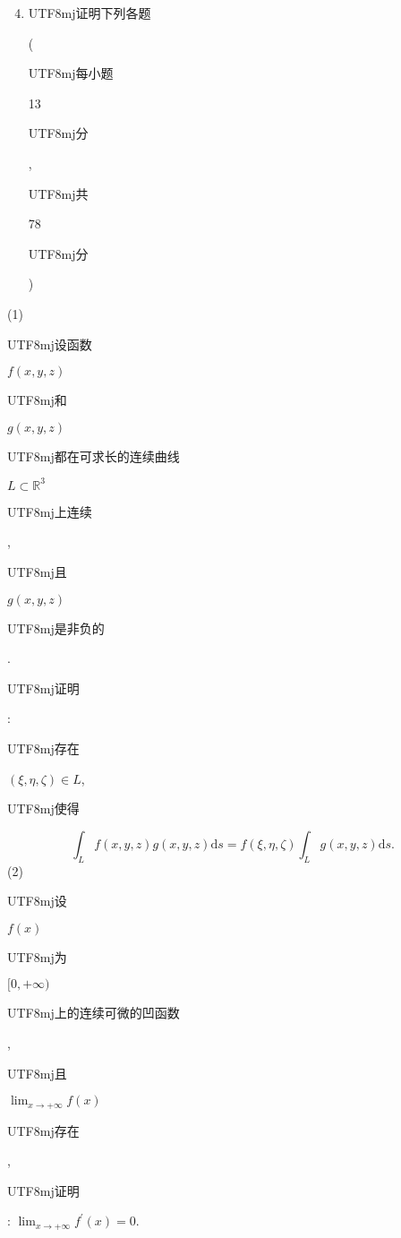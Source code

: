 \documentclass[10pt]{article}
\begin{document}
\begin{enumerate}
  \setcounter{enumi}{3}
  \item \begin{CJK}{UTF8}{mj}证明下列各题\end{CJK} (\begin{CJK}{UTF8}{mj}每小题\end{CJK} 13 \begin{CJK}{UTF8}{mj}分\end{CJK}, \begin{CJK}{UTF8}{mj}共\end{CJK} 78 \begin{CJK}{UTF8}{mj}分\end{CJK})
\end{enumerate}
(1) \begin{CJK}{UTF8}{mj}设函数\end{CJK} $f(x, y, z)$ \begin{CJK}{UTF8}{mj}和\end{CJK} $g(x, y, z)$ \begin{CJK}{UTF8}{mj}都在可求长的连续曲线\end{CJK} $L \subset \mathbb{R}^{3}$ \begin{CJK}{UTF8}{mj}上连续\end{CJK}, \begin{CJK}{UTF8}{mj}且\end{CJK} $g(x, y, z)$ \begin{CJK}{UTF8}{mj}是非负的\end{CJK}. \begin{CJK}{UTF8}{mj}证明\end{CJK}: \begin{CJK}{UTF8}{mj}存在\end{CJK} $(\xi, \eta, \zeta) \in L$, \begin{CJK}{UTF8}{mj}使得\end{CJK}
$$
\int_{L} f(x, y, z) g(x, y, z) \mathrm{d} s=f(\xi, \eta, \zeta) \int_{L} g(x, y, z) \mathrm{d} s .
$$
(2) \begin{CJK}{UTF8}{mj}设\end{CJK} $f(x)$ \begin{CJK}{UTF8}{mj}为\end{CJK} $[0,+\infty)$ \begin{CJK}{UTF8}{mj}上的连续可微的凹函数\end{CJK}, \begin{CJK}{UTF8}{mj}且\end{CJK} $\lim _{x \rightarrow+\infty} f(x)$ \begin{CJK}{UTF8}{mj}存在\end{CJK}, \begin{CJK}{UTF8}{mj}证明\end{CJK}: $\lim _{x \rightarrow+\infty} f^{\prime}(x)=0$.
\end{document}
